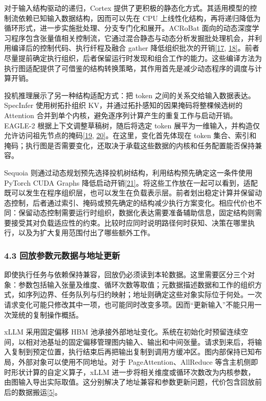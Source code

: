 \documentclass[UTF8,11pt,fontset=windows]{ctexart}
\begin{document}
对于输入结构驱动的递归，Cortex 提供了更积极的静态化方式。其适用模型的控制流依赖已知输入数据结构，因而可以先在 CPU 上线性化结构，再将递归降低为循环形式，进一步实施批处理、分支专门化和展开。ACRoBat 面向的动态深度学习程序包含张量值相关控制流，它通过混合静态与动态分析发掘批处理机会，并利用编译后的控制代码、执行纤程及融合 gather 降低组织批次的开销\protect\hyperlink{ref-17}{{[}17}, \protect\hyperlink{ref-18}{18{]}}。前者尽量提前确定执行组织，后者保留运行时发现和组合工作的能力。这些编译方法为执行图适配提供了可借鉴的结构转换策略，其作用首先是减少动态程序的调度与计算开销。

投机推理展示了另一种结构适配方式：把 token 之间的关系交给输入数据表达。SpecInfer 使用树拓扑组织 KV，并通过拓扑感知的因果掩码将整棵候选树的 Attention 合并到单个内核，避免逐序列计算产生的重复工作与启动开销。EAGLE-2 根据上下文调整草稿树，随后将选定 token 展平为一维输入，并构造仅允许访问祖先节点的掩码\protect\hyperlink{ref-19}{{[}19}, \protect\hyperlink{ref-20}{20{]}}。在这里，变化首先体现在 token 集合、索引和掩码；执行图是否需要变化，还取决于承载这些数据的内核和任务配置能否保持兼容。

Sequoia 则通过动态规划预先选择投机树结构，利用结构预先确定这一条件使用 PyTorch CUDA Graphs 降低启动开销\protect\hyperlink{ref-21}{{[}21{]}}。将这些工作放在一起可以看到，适配既可以发生在程序组织层，也可以发生在负载表示层。前者划出稳定计算并保留动态控制，后者通过索引、掩码或预先确定的结构减少执行方案变化。相应代价也不同：保留动态控制需要运行时组织，数据化表达需要准备辅助信息，固定结构则需要接受其对负载适应性的约束。比较时应同时说明路径何时获知、决策在哪里执行，以及为扩大复用范围付出了哪些额外工作。

\hypertarget{section-4-3}{%
\subsubsection{\texorpdfstring{\textbf{4.3 回放参数元数据与地址更新}}{4.3 回放参数元数据与地址更新}}\label{section-4-3}}

即使执行任务与依赖保持兼容，回放仍必须读到本轮数据。这里需要区分三个对象：参数包括输入张量及维度、循环次数等取值；元数据描述数据和工作的组织方式，如序列边界、任务队列与归约映射；地址则确定这些对象实际位于何处。一次请求变化可能只修改其中一项，也可能同时改变多项。因而``更新输入''不能只用一次笼统的复制操作概括。

xLLM 采用固定偏移 HBM 池承接外部地址变化。系统在初始化时预留连续空间，以相对池基址的固定偏移管理图内输入、输出和中间张量。请求到来后，将输入复制到预定位置，执行结束后再把输出复制到调用方缓冲区。图内部保持已知布局，外部对象可以使用不同地址。对于 PageAttention、AllReduce 等含主机侧即时形状计算的自定义算子，xLLM 进一步将相关维度或循环次数改为内核参数，由图输入导出实际取值。这分别解决了地址兼容和参数更新问题，代价包含回放前后的数据搬运\protect\hyperlink{ref-5}{{[}5{]}}。
\end{document}
